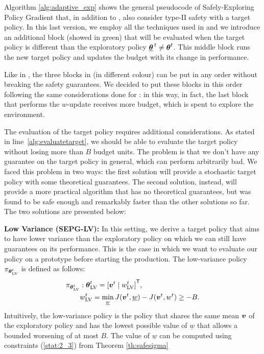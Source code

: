 Algorithm \ref{alg:adaptive_exp} shows the general pseudocode of Safely-Exploring Policy Gradient that, in addition to , also consider type-II safety with a target policy. In this last version, we employ all the techniques used in  and we introduce an additional block (showed in green) that will be evaluated when the target policy is different than the exploratory policy ${\underline{{\boldsymbol{\theta}}}^{\,t}} \neq {\boldsymbol{\theta}}^t$. This middle block runs the new target policy and updates the budget with its change in performance.

\begin{note}
Like in , the three blocks in  (in different colour) can be put in any order without breaking the safety guarantees. We decided to put these blocks in this order following the same considerations done for : in this way, in fact, the last block that performs the $w$-update receives more budget, which is spent to explore the environment.
\end{note}

The evaluation of the target policy requires additional considerations. As stated in line~\ref{alg:evaluatetarget}, we should be able to evaluate the target policy without losing more than $B$ budget units. The problem is that we don't have any guarantee on the target policy in general, which can perform arbitrarily bad. We faced this problem in two ways: the first solution will provide a stochastic target policy with some theoretical guarantees. The second solution, instead, will provide a more practical algorithm that has no theoretical guarantees, but was found to be safe enough and remarkably faster than the other solutions so far. The two solutions are presented below:

\textbf{Low Variance (SEPG-LV):} In this setting, we derive a target policy that aims to have lower variance than the exploratory policy on which we can still have guarantees on its performance. This is the case in which we want to evaluate our policy on a prototype before starting the production. The low-variance policy $\pi_{{\boldsymbol{\theta}}^t_{\text{LV}}}$ is defined as follows:
\begin{align*}
\pi_{{\boldsymbol{\theta}}^t_{\text{LV}}} &: {\boldsymbol{\theta}}^t_{\text{LV}} = {[\boldsymbol{v}^t \mid w^t_{\text{LV}}]}^{\mathsf{T}}, \\
&w^t_{\text{LV}} = \min_{\underline{w}} J(\boldsymbol{v}^t, \underline{w}) - J(\boldsymbol{v}^t, w^t) \geq -B .
\end{align*}
Intuitively, the low-variance policy is the policy that shares the same mean $\boldsymbol{v}$ of the exploratory policy and has the lowest possible value of $\underline{w}$ that allows a bounded worsening of at most $B$. The value of $\underline{w}$ can be computed using constraints (\ref{stat:2_3}) from Theorem \ref{th:safesigma}

